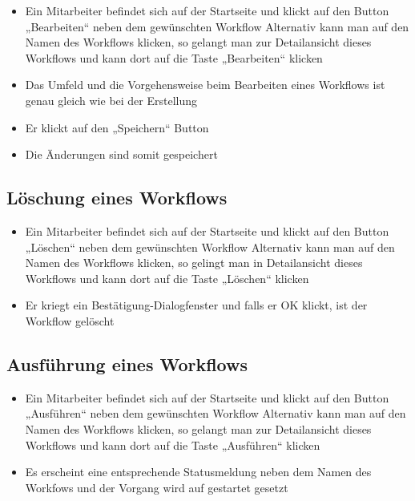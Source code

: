         \begin{itemize}

            \item Ein Mitarbeiter befindet sich auf der Startseite und klickt auf den Button „Bearbeiten“ neben dem gewünschten Workflow \newline
            Alternativ kann man auf den Namen des Workflows klicken, so gelangt man zur Detailansicht dieses Workflows und kann dort auf die Taste „Bearbeiten“ klicken

            \item Das Umfeld und die Vorgehensweise beim Bearbeiten eines Workflows ist genau gleich wie bei der Erstellung

            \item Er klickt auf den „Speichern“ Button

            \item Die Änderungen sind somit gespeichert

        \end{itemize}

        \subsection{Löschung eines Workflows}

        \begin{itemize}

            \item Ein Mitarbeiter befindet sich auf der Startseite und klickt auf den Button „Löschen“ neben dem gewünschten Workflow \newline
            Alternativ kann man auf den Namen des Workflows klicken, so gelingt man in Detailansicht dieses Workflows und kann dort auf die Taste „Löschen“ klicken

            \item Er kriegt ein Bestätigung-Dialogfenster und falls er OK klickt, ist der Workflow gelöscht
                
        \end{itemize}

        \subsection{Ausführung eines Workflows}

        \begin{itemize}

            \item Ein Mitarbeiter befindet sich auf der Startseite und klickt auf den Button „Ausführen“ neben dem gewünschten Workflow \newline
            Alternativ kann man auf den Namen des Workflows klicken, so gelangt man zur Detailansicht dieses Workflows und kann dort auf die Taste „Ausführen“ klicken

            \item Es erscheint eine entsprechende Statusmeldung neben dem Namen des Workfows und der Vorgang wird auf gestartet gesetzt
                
        \end{itemize}

